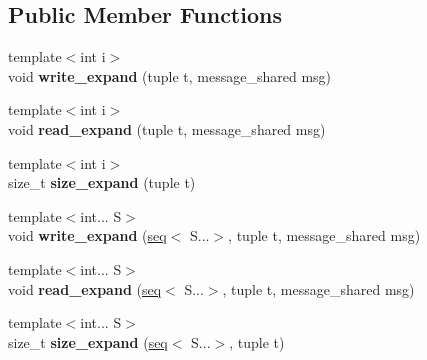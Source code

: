 \subsection*{Public Member Functions}
\begin{DoxyCompactItemize}
\item 
\hypertarget{classgal_1_1network_1_1vector__ext_a939f4207902372496e63b9928b399129}{{\footnotesize template$<$int i$>$ }\\void {\bfseries write\-\_\-expand} (tuple t, message\-\_\-shared msg)}\label{classgal_1_1network_1_1vector__ext_a939f4207902372496e63b9928b399129}

\item 
\hypertarget{classgal_1_1network_1_1vector__ext_a7536e046bfdfcc2546929f0cbb899d5f}{{\footnotesize template$<$int i$>$ }\\void {\bfseries read\-\_\-expand} (tuple t, message\-\_\-shared msg)}\label{classgal_1_1network_1_1vector__ext_a7536e046bfdfcc2546929f0cbb899d5f}

\item 
\hypertarget{classgal_1_1network_1_1vector__ext_afdb06e31b1925621ae74abefdeffbfbf}{{\footnotesize template$<$int i$>$ }\\size\-\_\-t {\bfseries size\-\_\-expand} (tuple t)}\label{classgal_1_1network_1_1vector__ext_afdb06e31b1925621ae74abefdeffbfbf}

\item 
\hypertarget{classgal_1_1network_1_1vector__ext_a5d5973d02bea3a06c8967d8322d468fd}{{\footnotesize template$<$int... S$>$ }\\void {\bfseries write\-\_\-expand} (\hyperlink{structseq}{seq}$<$ S...$>$, tuple t, message\-\_\-shared msg)}\label{classgal_1_1network_1_1vector__ext_a5d5973d02bea3a06c8967d8322d468fd}

\item 
\hypertarget{classgal_1_1network_1_1vector__ext_a8c931a009f25967b60c08e22db9156e4}{{\footnotesize template$<$int... S$>$ }\\void {\bfseries read\-\_\-expand} (\hyperlink{structseq}{seq}$<$ S...$>$, tuple t, message\-\_\-shared msg)}\label{classgal_1_1network_1_1vector__ext_a8c931a009f25967b60c08e22db9156e4}

\item 
\hypertarget{classgal_1_1network_1_1vector__ext_a82e2e595a33e267c78a32d1e54516933}{{\footnotesize template$<$int... S$>$ }\\size\-\_\-t {\bfseries size\-\_\-expand} (\hyperlink{structseq}{seq}$<$ S...$>$, tuple t)}\label{classgal_1_1network_1_1vector__ext_a82e2e595a33e267c78a32d1e54516933}


\end{DoxyCompactItemize}
